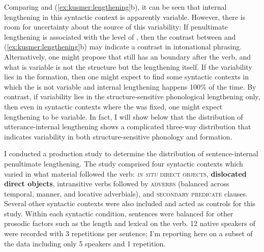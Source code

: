 \documentclass[output=paper,modfonts,nonflat,hidelinks]{langsci/langscibook}
\begin{document}
Comparing  and
(\ref{ex:kusmer:lengthening}b), it can be seen that internal lengthening in
this syntactic context is apparently variable.  However, there is room for
uncertainty about the source of this variability: If penultimate lengthening is
associated with the  level of , then the
contrast between  and (\ref{ex:kusmer:lengthening}b)
may indicate a contrast in intonational phrasing.  Alternatively, one might
propose that  still has an  boundary
after the verb, and what is variable is not the structure but the lengthening
itself. If the variability lies in the  formation, then one
might expect to find some syntactic contexts in which the  is
not variable and internal lengthening happens 100\% of the time. By contrast,
if variability lies in the structure-sensitive phonological lengthening only,
then even in syntactic contexts where the  was fixed, one
might expect lengthening to be variable. In fact, I will show below that the
distribution of utterance-internal lengthening shows a complicated three-way
distribution that indicates variability in both structure-sensitive phonology
and  formation.

I conducted a production study to determine the distribution of
sentence-in\-ter\-nal penultimate lengthening. The study comprised four syntactic
contexts which varied in what material followed the verb: \textsc{\textit{in
situ} direct objects}, \textbf{dislocated direct objects}, intransitive verbs
followed by \textsc{adverbs} (balanced across temporal, manner, and locative
adverbials), and \textsc{secondary predicate} clauses. Several other syntactic
contexts were also included and acted as controls for this study.  Within each
syntactic condition, sentences were balanced for other prosodic factors such as
the length and lexical  on the verb. 12 native speakers of  were
recorded with 3 repetitions per sentence; I'm reporting here on a subset of the
data including only 5 speakers and 1 repetition.

\end{document}
